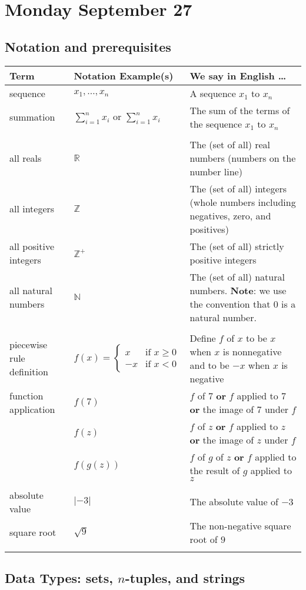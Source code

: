 \documentclass[12pt, oneside]{article}
\begin{document}
\section*{Monday September 27}
\subsection*{Notation and prerequisites}


\begin{center}
\begin{tabular}{|llp{9.8cm}|}
\hline
{\bf Term} & {\bf Notation Example(s)} & {\bf We say in English \ldots } \\
\hline
sequence & $x_1, \ldots, x_n$ & A sequence $x_1$ to $x_n$ \\
summation & $\sum_{i=1}^n x_i$ or $\displaystyle{\sum_{i=1}^n x_i}$ & The sum of the terms of the sequence $x_1$ to $x_n$ \\
&&\\
all reals & $\mathbb{R}$ & The (set of all) real numbers (numbers on the number line)\\
all integers & $\mathbb{Z}$ & The (set of all) integers (whole numbers including negatives, zero, and positives) \\
all positive integers & $\mathbb{Z}^+$ & The (set of all) strictly positive integers \\
all natural numbers & $\mathbb{N}$ & The (set of all) natural numbers. {\bf Note}: we use the convention that $0$ is a natural number. \\
&&\\
piecewise rule definition & $f(x) = \begin{cases} x & \text{if~}x \geq 0 \\ -x & \text{if~}x<0\end{cases}$ &
Define $f$ of $x$ to be $x$ when $x$ is nonnegative and to be $-x$ when $x$ is negative\\
function application & $f(7)$ & $f$ of $7$ {\bf or} $f$ applied to $7$ {\bf or} the image of $7$ under $f$\\
                     & $f(z)$ & $f$ of $z$ {\bf or} $f$ applied to $z$ {\bf or} the image of $z$ under $f$\\
                     & $f(g(z))$ & $f$ of $g$ of $z$ {\bf or} $f$ applied to the result of $g$ applied to $z$ \\
&&\\
absolute value & $\lvert -3 \rvert$ & The absolute value of $-3$ \\
square root & $\sqrt{9}$ & The non-negative square root of $9$ \\
&&\\


\hline
\end{tabular}
\end{center} \subsection*{Data Types: sets, $n$-tuples, and strings}
\end{document}
